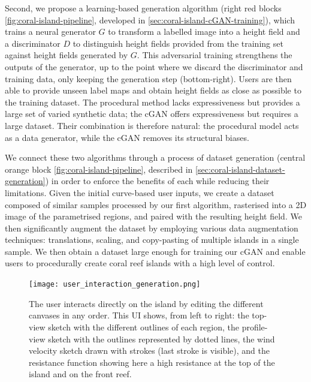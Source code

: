 Second, we propose a learning-based generation algorithm (right red blocks \cref{fig:coral-island-pipeline}, developed in \cref{sec:coral-island-cGAN-training}), which trains a neural generator $G$ to transform a labelled image into a height field and a discriminator $D$ to distinguish height fields provided from the training set against height fields generated by $G$. This adversarial training strengthens the outputs of the generator, up to the point where we discard the discriminator and training data, only keeping the generation step (bottom-right). Users are then able to provide unseen label maps and obtain height fields as close as possible to the training dataset. The procedural method lacks expressiveness but provides a large set of varied synthetic data; the cGAN offers expressiveness but requires a large dataset. Their combination is therefore natural: the procedural model acts as a data generator, while the cGAN removes its structural biases.

We connect these two algorithms through a process of dataset generation (central orange block \cref{fig:coral-island-pipeline}, described in \cref{sec:coral-island-dataset-generation}) in order to enforce the benefits of each while reducing their limitations. Given the initial curve-based user inputs, we create a dataset composed of similar samples processed by our first algorithm, rasterised into a 2D image of the parametrised regions, and paired with the resulting height field. We then significantly augment the dataset by employing various data augmentation techniques: translations, scaling, and copy-pasting of multiple islands in a single sample. We then obtain a dataset large enough for training our cGAN and enable users to procedurally create coral reef islands with a high level of control.

\begin{figure}
    \texttt{[image: user\_interaction\_generation.png]}
    \caption[User interface in the curve-based island generation method]{The user interacts directly on the island by editing the different canvases in any order. This UI shows, from left to right: the top-view sketch with the different outlines of each region, the profile-view sketch with the outlines represented by dotted lines, the wind velocity sketch drawn with strokes (last stroke is visible), and the resistance function showing here a high resistance at the top of the island and on the front reef.}
    \label{fig:coral-island-wind-from-strokes-interaction}
\end{figure}


